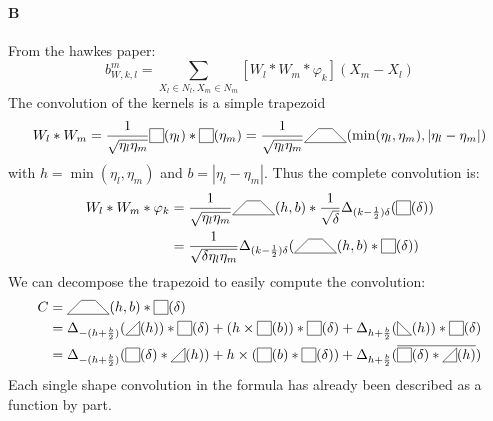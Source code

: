 \documentclass[a4paper,10pt]{article}
\newcommand\Shifted[2]{\Delta_{#1}(#2)}
\newcommand\Reversed[1]{\overline{#1}} %
\newcommand\SymSquare{\begin{tikzpicture}[baseline=0.5ex]%
        \draw (0,0) -- (0,1em) -- (1em,1em) -- (1em,0) -- cycle;
\end{tikzpicture}}
\newcommand\Indicator[1]{\SymSquare(#1)}
\newcommand\SymPositiveTriangle{\begin{tikzpicture}[baseline=0.5ex]%
        \draw (0,0) -- (1em,0em) -- (1em,1em) -- cycle;
\end{tikzpicture}}
\newcommand\PositiveTriangle[1]{\SymPositiveTriangle(#1)}
\newcommand\SymNegativeTriangle{\begin{tikzpicture}[baseline=0.5ex]%
        \draw (0,0) -- (0,1em) -- (1em,0em) -- cycle;
\end{tikzpicture}}
\newcommand\NegativeTriangle[1]{\SymNegativeTriangle(#1)}
\newcommand\SymTrapezoid{\begin{tikzpicture}[baseline=0.5ex]%
        \draw (0,0) -- (3em,0) -- (2em,1em) -- (1em,1em) -- cycle;
\end{tikzpicture}}
\newcommand\Trapezoid[2]{\SymTrapezoid(#1,#2)}%
\newcommand\Convolution{\ast}
\begin{document}
\paragraph{B}
From the hawkes paper:
\[ b_{W,k,l}^m = \sum_{X_l \in N_l, X_m \in N_m} [W_l \Convolution W_m \Convolution \varphi_k] (X_m - X_l) \]
The convolution of the kernels is a simple trapezoid
\[
    W_l \Convolution W_m =
    \frac{1}{\sqrt{\eta_l \eta_m}} \Indicator{\eta_l} \Convolution \Indicator{\eta_m} =
    \frac{1}{\sqrt{\eta_l \eta_m}} \Trapezoid{\min(\eta_l,\eta_m)}{|\eta_l-\eta_m|}
\]
with $h = \min(\eta_l,\eta_m)$ and $b = |\eta_l-\eta_m|$.
Thus the complete convolution is:
\[ \begin{split}
    W_l \Convolution W_m \Convolution \varphi_k
    & = \frac{1}{\sqrt{\eta_l \eta_m}} \Trapezoid{h}{b} \Convolution \frac{1}{\sqrt{\delta}} \Shifted{(k-\frac{1}{2})\delta}{\Indicator{\delta}} \\
    &= \frac{1}{\sqrt{\delta \eta_l \eta_m}} \Shifted{(k-\frac{1}{2})\delta}{\Trapezoid{h}{b} \Convolution \Indicator{\delta}}
\end{split} \]
We can decompose the trapezoid to easily compute the convolution:
\[ \begin{split}
    C & = \Trapezoid{h}{b} \Convolution \Indicator{\delta} \\
    & = \Shifted{-(h+\frac{b}{2})}{\PositiveTriangle{h}} \Convolution \Indicator{\delta}  + (h \times \Indicator{b}) \Convolution \Indicator{\delta} + \Shifted{h+\frac{b}{2}}{\NegativeTriangle{h}} \Convolution \Indicator{\delta} \\
    & = \Shifted{-(h+\frac{b}{2})}{\Indicator{\delta} \Convolution \PositiveTriangle{h}} + h \times (\Indicator{b} \Convolution \Indicator{\delta}) + \Shifted{h+\frac{b}{2}}{\Reversed{\Indicator{\delta} \Convolution \PositiveTriangle{h}}}
\end{split} \]
Each single shape convolution in the formula has already been described as a function by part.
\end{document}
